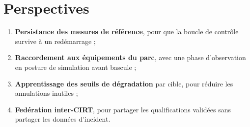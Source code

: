 \section*{Perspectives}
\begin{enumerate}
  \item \textbf{Persistance des mesures de r\'ef\'erence}, pour que la boucle de
        contr\^ole survive \`a un red\'emarrage ;
  \item \textbf{Raccordement aux \'equipements du parc}, avec une phase d'observation
        en posture de simulation avant bascule ;
  \item \textbf{Apprentissage des seuils de d\'egradation} par cible, pour r\'eduire les
        annulations inutiles ;
  \item \textbf{Fed\'eration inter-CIRT}, pour partager les qualifications valid\'ees
        sans partager les donn\'ees d'incident.
\end{enumerate}
